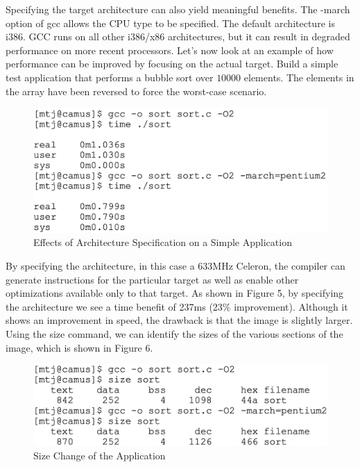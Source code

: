\documentclass[conference]{IEEEtran}
\begin{document}
Specifying the target architecture can also yield meaningful benefits. The -march option of gcc allows the CPU type to be specified. The default architecture is i386. GCC runs on all other i386/x86 architectures, but it can result in degraded performance on more recent processors. Let's now look at an example of how performance can be improved by focusing on the actual target. Build a simple test application that performs a bubble sort over $10000$ elements. The elements in the array have been reversed to force the worst-case scenario.\cite{b4}

\begin{figure}[htbp]
\centering
\includegraphics [width=0.85\linewidth]{pictures/GCCarchi.png}
\caption{Effects of Architecture Specification on a Simple Application\cite{b4}}
\label{fig5}
\end{figure}

By specifying the architecture, in this case a 633MHz Celeron, the compiler can generate instructions for the particular target as well as enable other optimizations available only to that target. As shown in Figure 5, by specifying the architecture we see a time benefit of 237ms (23\% improvement). Although it shows an improvement in speed, the drawback is that the image is slightly larger. Using the size command, we can identify the sizes of the various sections of the image, which is shown in Figure 6.\cite{b4}

\begin{figure}[htbp]
\centering
\includegraphics [width=0.85\linewidth]{pictures/GCCsize.png}
\caption{Size Change of the Application\cite{b4}}
\label{fig6}
\end{figure}
\end{document}
